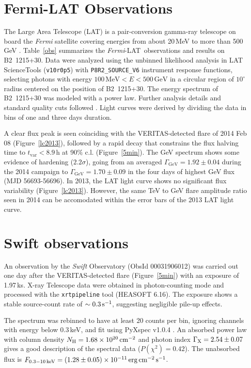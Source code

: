 \documentclass[twocolumn]{aastex6}
\def\b2{B2~1215+30}
\def\lat{\textit{Fermi}-LAT}
\begin{document}
\section{Fermi-LAT Observations}
\label{s:lat}
The Large Area Telescope (LAT) is a pair-conversion gamma-ray telescope on board the {\it{Fermi}} satellite covering energies from about 20\,MeV to more than 500\,GeV \citep{Atwood}. 
Table~\ref{obs} summarizes the \lat\ observations and results on \b2. 
Data were analyzed using the unbinned likelihood analysis in LAT ScienceTools ({\tt v10r0p5})  with {\tt P8R2\_SOURCE\_V6} instrument response functions, selecting photons with energy $100\,\mathrm{MeV}<E<500\,\mathrm{GeV}$ in a circular region of $10^{\circ}$ radius centered on the position of \b2. The energy spectrum of \b2 was modeled with a power law. Further analysis details and standard quality cuts followed \citet{3fgl}.
Light curves were derived by dividing the data in bins of one and three days duration. 

A clear flux peak is seen coinciding with the VERITAS-detected flare of 2014 Feb 08 (Figure~\ref{lc2013}), followed by a rapid decay that constrains the flux halving time to $t_{\mathrm{var}} < 8.9$\,h at 90\% c.l. (Figure~\ref{5min}). The GeV spectrum shows some evidence of hardening ($2.2 \sigma$), going from an averaged $\Gamma_\mathrm{GeV} = 1.92 \pm 0.04$ during the 2014 campaign to $\Gamma_\mathrm{GeV} = 1.70 \pm 0.09$ in the four days of highest GeV flux (MJD 56693-56696).
In 2013,  the LAT light curve shows no significant flux variability (Figure~\ref{lc2013}). However, the same TeV to GeV flare amplitude ratio seen in 2014 can be accomodated within the error bars of the 2013 LAT light curve.

\section{Swift observations}
\label{sec:xray}
An observation by the {\it Swift}
Observatory (ObsId 00031906012) was carried out one day after the VERITAS-detected flare (Figure~\ref{5min})  
with an exposure of 1.97\,ks. X-ray Telescope  \citep[XRT, $0.2-10$\,keV,][]{2005SSRv..120..165B} data  were obtained in photon-counting 
mode and processed with the
 {\tt xrtpipeline} tool (HEASOFT 6.16).
The exposure shows a stable 
source-count rate of 
$\sim 0.3\,{\rm s^{-1}}$, suggesting negligible pile-up effects.

The spectrum was rebinned to
have at least 20 counts per bin,
ignoring channels with energy below 0.3\,keV, and fit using PyXspec v1.0.4
\citep{1996ASPC..101...17A}.
An absorbed power law with column density $N_{\rm H}=1.68\times10^{20}\,{\rm cm^{-2}}$ \citep{2005A&A...440..775K} and photon index $\Gamma_{\rm X}=2.54\pm0.07$ gives a good description of the spectral data ($P(\chi^2)=0.42$). 
The unabsorbed flux is $F_{0.3-10\,{\rm keV}}=\left(1.28 \pm 0.05 \right)\times 10^{-11}\,{\rm erg}\,{\rm cm^{-2}}\,{\rm s^{-1}}$.
\end{document}
